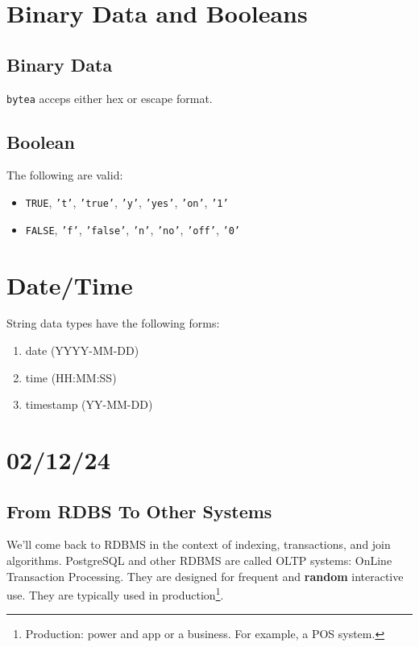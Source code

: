 \documentclass{report}
\renewcommand{\bf}[1]{\textbf{{#1}}}
\renewcommand{\tt}[1]{\texttt{{#1}}}
\begin{document}
\section{Binary Data and Booleans}
\subsection{Binary Data}
\tt{bytea} acceps either hex or escape format.
\subsection{Boolean}
The following are valid: 
\begin{itemize}[label=$\to$]
    \item \tt{TRUE}, \tt{'t'}, \tt{'true'}, \tt{'y'}, \tt{'yes'}, \tt{'on'}, \tt{'1'}
    \item \tt{FALSE}, \tt{'f'}, \tt{'false'}, \tt{'n'}, \tt{'no'}, \tt{'off'}, \tt{'0'}
\end{itemize}




\section{Date/Time}
String data types have the following forms:
\begin{enumerate}[label=$\to$]
    \item date (YYYY-MM-DD)
    \item time (HH:MM:SS)
    \item timestamp (YY-MM-DD)
\end{enumerate}

\newpage
\section{02/12/24}

\subsection{From RDBS To Other Systems}
We'll come back to RDBMS in the context of indexing, transactions, and join algorithms. PostgreSQL
and other RDBMS are called OLTP systems: OnLine Transaction Processing. They are designed for
frequent and \bf{random} interactive use. They are typically used in production\footnote{Production:
power and app or a business. For example, a POS system.}. 
\end{document}
